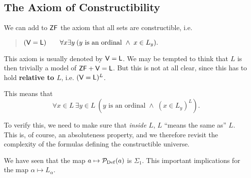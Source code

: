 \subsection{The Axiom of Constructibility}

We can add to $\mathsf{ZF}$ the axiom that all sets are constructible, i.e.

\begin{quote}
$(\mathsf{V=L}) \qquad \forall x \exists y \: (y \text{ is an ordinal } \wedge \; x \in L_y).$
\end{quote}

This axiom is usually denoted by $\mathsf{V=L}$. We may be tempted to think that $L$ is then trivially a model of $\mathsf{ZF} + \mathsf{V=L}$. But this is not at all clear, since this has to hold \textbf{relative to $L$}, i.e. $(\mathsf{V=L})^L$.

This means that
\begin{equation*}
\forall x \in L \: \exists y \in L \: (y \text{ is an ordinal } \wedge \; (x \in L_y)^L).
\end{equation*}

To verify this, we need to make sure that \textit{inside} $L$, $L$ ``means the same as'' $L$. This is, of course, an absoluteness property, and we therefore revisit the complexity of the formulas defining the constructible universe.

We have seen that the map $a \mapsto \mathcal{P}_{\operatorname{Def}}(a)$ is $\Sigma_1$. This important implications for the map $\alpha \mapsto L_\alpha$.

